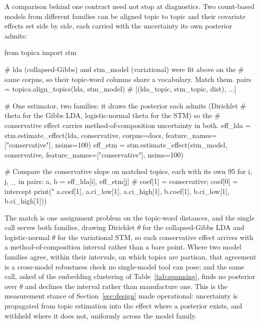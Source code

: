 \documentclass[article,nojss]{jss}
\begin{document}
A comparison behind one contract need not stop at diagnostics. Two count-based
models from different families can be aligned topic to topic and their covariate
effects set side by side, each carried with the uncertainty its own posterior
admits:

\begin{CodeChunk}
\begin{CodeInput}
from topica import stm

# lda (collapsed-Gibbs) and stm_model (variational) were fit above on the
# same corpus, so their topic-word columns share a vocabulary. Match them.
pairs = topica.align_topics(lda, stm_model)   # [(lda_topic, stm_topic, dist), ...]

# One estimator, two families: it draws the posterior each admits (Dirichlet
# theta for the Gibbs LDA, logistic-normal theta for the STM) so the
# conservative effect carries method-of-composition uncertainty in both.
eff_lda = stm.estimate_effect(lda, conservative, corpus=docs,
                              feature_names=["conservative"], nsims=100)
eff_stm = stm.estimate_effect(stm_model, conservative,
                              feature_names=["conservative"], nsims=100)

# Compare the conservative slope on matched topics, each with its own 95%
for i, j, _ in pairs:
    a, b = eff_lda[i], eff_stm[j]   # coef[1] = conservative; coef[0] = intercept
    print("%
        a.coef[1], a.ci_low[1], a.ci_high[1],
        b.coef[1], b.ci_low[1], b.ci_high[1]))
\end{CodeInput}
\end{CodeChunk}

The match is one assignment problem on the topic-word distances, and the single
 call serves both families, drawing Dirichlet $\theta$ for
the collapsed-Gibbs LDA and logistic-normal $\theta$ for the variational STM, so
each conservative effect arrives with a method-of-composition interval rather than
a bare point. Where two model families agree, within their intervals, on which
topics are partisan, that agreement is a cross-model robustness check no
single-model tool can pose; and the same call, asked of the embedding clustering
of Table~\ref{tab:spanning}, finds no posterior over $\theta$ and declines the
interval rather than manufacture one. This is the measurement stance of
Section~\ref{sec:design} made operational: uncertainty is propagated from topic
estimation into the effect where a posterior exists, and withheld where it does
not, uniformly across the model family.
\end{document}

